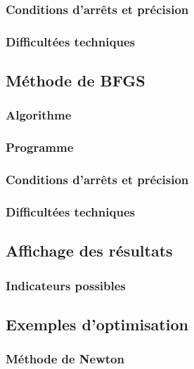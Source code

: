 \documentclass[3p, twocolumn]{elsarticle}
\begin{document}
\subsubsection{Conditions d'arrêts et précision}
\subsubsection{Difficultées techniques}
\subsection{Méthode de BFGS}
\subsubsection{Algorithme}
\subsubsection{Programme}
\subsubsection{Conditions d'arrêts et précision}
\subsubsection{Difficultées techniques}
\subsection{Affichage des résultats}
\subsubsection{Indicateurs possibles}
\subsection{Exemples d'optimisation}
\subsubsection{Méthode de Newton}
\end{document}

